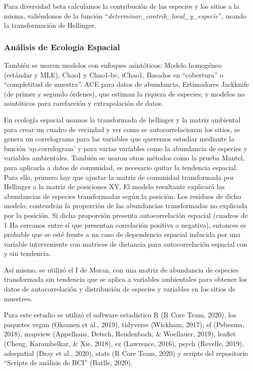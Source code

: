 \documentclass[11pt,]{article}
\begin{document}
Para diversidad beta calculamos la contribución de las especies y los
sitios a la misma, valiéndonos de la función
``\emph{determinar\_contrib\_local\_y\_especie}'', usando la
transformación de Hellinger.

\subsubsection{Análisis de Ecología
Espacial}\label{anuxe1lisis-de-ecologuxeda-espacial}

También se usaron modelos con enfoques asintóticos: Modelo homogéneo
(estándar y MLE), Chao1 y Chao1-bc, iChao1, Basados en ``cobertura'' o
``completitud de muestra''. ACE para datos de abundancia, Estimadores
Jackknife (de primer y segundo órdenes), que estiman la riqueza de
especies; y modelos no asintóticos para rarefacción y extrapolación de
datos.

En ecología espacial usamos la transformada de hellinger y la matriz
ambiental para crear un cuadro de vecindad y ver como se
autocorrelacionan los sitios, se genera un correlograma para las
variables que queremos estudiar mediante la función `sp.correlogram' y
para varias variables como la abundancia de especies y variables
ambientales. También se usaron otros métodos como la prueba Mantel, para
aplicarla a datos de comunidad, es necesario quitar la tendencia
espacial. Para ello, primero hay que ajustar la matriz de comunidad
transformada por Hellinger a la matriz de posiciones XY. El modelo
resultante explicará las abundancias de especies transformadas según la
posición. Los residuos de dicho modelo, contendrán la proporción de las
abundancias transformadas no explicada por la posición. Si dicha
proporción presenta autocorrelación espacial (cuadros de 1 Ha cercanos
entre sí que presentan correlación positiva o negativa), entonces es
probable que se esté frente a un caso de dependencia espacial inducida
por una variable interveniente con matrices de distancia para
autocorrelación espacial con y sin tendencia.

Así mismo, se utilizó el I de Moran, con una matriz de abundancia de
especies transformada sin tendencia que se aplica a variables
ambientales para obtener los datos de autocorrelación y distribución de
especies y variables en los sitios de muestreo.

Para este estudio se utilizó el software estadístico R (R Core Team,
2020), los paquetes vegan (Oksanen et al., 2019), tidyverse (Wickham,
2017), sf (Pebesma, 2018), mapview (Appelhans, Detsch, Reudenbach, \&
Woellauer, 2019), leaflet (Cheng, Karambelkar, \& Xie, 2018), ez
(Lawrence, 2016), psych (Revelle, 2019), adespatial (Dray et al., 2020),
stats (R Core Team, 2020) y scripts del repositorio ``Scripts de
análisis de BCI'' (Batlle, 2020).
\end{document}
